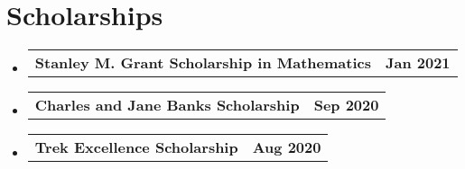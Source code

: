 \documentclass[letterpaper,11pt]{article}
\makeatletter
\newcommand{\resumeScholarshipHeading}[2]{
    \item
    \begin{tabular*}{1\textwidth}{l@{\extracolsep{\fill}}r}
      \small#1 & \textbf{\small #2}\\
    \end{tabular*}
}
\newcommand{\resumeSubHeadingListStart}{\begin{itemize}[leftmargin=0.0in, label={}]}
\newcommand{\resumeSubHeadingListEnd}{\end{itemize}}
\makeatother
\begin{document}
\section{Scholarships}
  \resumeSubHeadingListStart
    \resumeScholarshipHeading
      {\textbf{Stanley M. Grant Scholarship in Mathematics}}{Jan 2021}
    \resumeScholarshipHeading
      {\textbf{Charles and Jane Banks Scholarship}}{Sep 2020}
    \resumeScholarshipHeading
      {\textbf{Trek Excellence Scholarship}}{Aug 2020}
  \resumeSubHeadingListEnd
\end{document}
